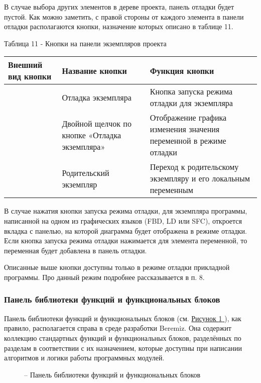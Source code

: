 \documentclass[letterpaper,10pt,russian]{sphinxmanual}
\begin{document}
В случае выбора других элементов в дереве проекта, панель отладки будет
пустой. Как можно заметить, с правой стороны от каждого элемента в
панели отладки располагаются кнопки, назначение которых описано в
таблице 11.

Таблица 11 - Кнопки на панели экземпляров проекта

\noindent\begin{tabulary}{\linewidth}{|L|L|L|}
\hline
\textsf{\relax 
Внешний вид кнопки
\unskip}\relax &\textsf{\relax 
Название кнопки
\unskip}\relax &\textsf{\relax 
Функция кнопки
\unskip}\relax \\
\hline
{}
&
Отладка экземпляра
&
Кнопка запуска режима
отладки для
экземпляра
\\
\hline
{}
&
Двойной щелчок по
кнопке «Отладка
экземпляра»
&
Отображение графика
изменения значения
переменной в режиме
отладки
\\
\hline
{}
&
Родительский
экземпляр
&
Переход к
родительскому
экземпляру и его
локальным переменным
\\
\hline\end{tabulary}


В случае нажатия кнопки запуска режима отладки, для экземпляра
программы, написанной на одном из графических языков (FBD, LD или SFC),
откроется вкладка с панелью, на которой диаграмма будет отображена в
режиме отладки. Если кнопка запуска режима отладки нажимается
для элемента переменной, то переменная будет добавлена в панель отладки.

Описанные выше кнопки доступны только в режиме отладки прикладной
программы. Про данный режим подробнее рассказывается в п. 8.


\subsubsection{Панель библиотеки функций и функциональных блоков}
\label{usage_guide/ide_components:id9}
Панель библиотеки функций и функциональных блоков (см. \hyperref[usage_guide/ide_components:image131]{Рисунок \ref{usage_guide/ide_components:image131} }), как
правило, располагается справа в среде разработки Beremiz. Она содержит
коллекцию стандартных функций и функциональных блоков, разделённых по
разделам в соответствии с их назначением, которые доступны при написании
алгоритмов и логики работы программных модулей.
\begin{figure}[htbp]
\centering
\capstart

\noindent{}
\caption{– Панель библиотеки функций и функциональных блоков}\label{usage_guide/ide_components:image131}\end{figure}
\end{document}
